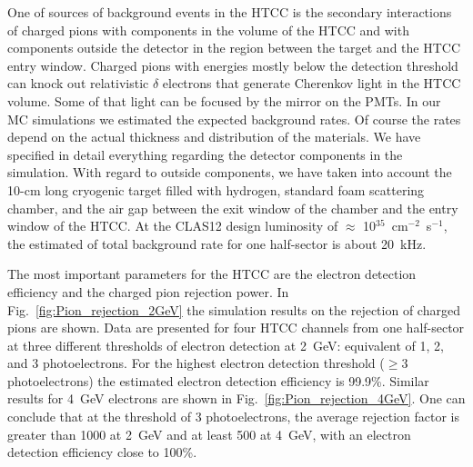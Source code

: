 One of sources of background events in the HTCC is the secondary interactions of charged pions with components
in the volume of the HTCC and with components outside the detector in the region between the target and the
HTCC entry window. Charged pions with energies mostly below the detection threshold can knock out relativistic
$\delta$ electrons that generate Cherenkov light in the HTCC volume. Some of that light can be focused by the
mirror on the PMTs. In our MC simulations we estimated the expected background rates. Of course the rates
depend on the actual thickness and distribution of the materials. We have specified in detail  everything regarding
the detector components in the simulation. With regard to outside components, we have taken into account the
10-cm long cryogenic target filled with hydrogen, standard foam scattering chamber, and the air gap between the
exit window of the chamber and the entry window of the HTCC. At the CLAS12 design luminosity of
$\approx$ 10$^{35}$~cm$^{-2}$~s$^{-1}$, the estimated of total background rate for one half-sector is about
20~kHz.

The most important parameters for the HTCC are the electron detection efficiency and the charged pion rejection
power. In Fig.~\ref{fig:Pion_rejection_2GeV} the simulation results on the rejection of charged pions are shown.
Data are presented for four HTCC channels from one half-sector at three different thresholds of electron
detection at 2~GeV: equivalent of 1, 2, and 3 photoelectrons. For the highest electron detection threshold ($\ge$3
photoelectrons) the estimated electron detection efficiency is 99.9\%. Similar results for 4~GeV electrons are
shown in Fig.~\ref{fig:Pion_rejection_4GeV}. One can conclude that at the threshold of 3 photoelectrons, the
average rejection factor is greater than 1000 at 2~GeV and at least 500 at 4~GeV, with an electron detection
efficiency close to 100\%.

